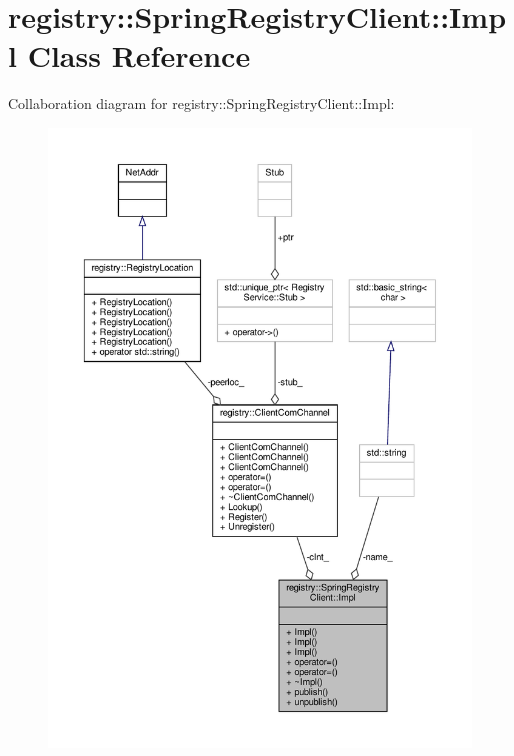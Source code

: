 \hypertarget{classregistry_1_1SpringRegistryClient_1_1Impl}{}\section{registry\+:\+:Spring\+Registry\+Client\+:\+:Impl Class Reference}
\label{classregistry_1_1SpringRegistryClient_1_1Impl}


Collaboration diagram for registry\+:\+:Spring\+Registry\+Client\+:\+:Impl\+:\nopagebreak
\begin{figure}[H]
\begin{center}
\leavevmode
\includegraphics[width=350pt]{classregistry_1_1SpringRegistryClient_1_1Impl__coll__graph}
\end{center}
\end{figure}
